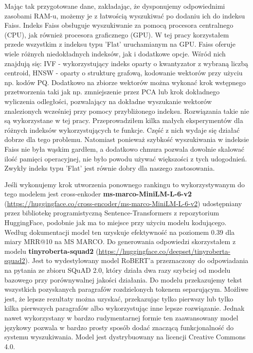 Mając tak przygotowane dane, zakładając, że dysponujemy odpowiednimi zasobami RAM-u, możemy je z łatwością wyszukiwać po dodaniu ich do indeksu Faiss. Indeks Faiss obsługuje wyszukiwanie za pomocą procesora centralnego (CPU), jak również procesora graficznego (GPU). W tej pracy korzystałem przede wszystkim z indeksu typu 'Flat' uruchamianym na GPU. Faiss oferuje wiele różnych niedokładnych indeksów, jak i dodatkowe opcje. Wśród nich znajdują się: IVF - wykorzystujący indeks oparty o kwantyzator z wybraną liczbą centroid, HNSW - oparty o strukturę grafową, kodowanie wektorów przy użyciu np. kodów PQ. Dodatkowo na zbiorze wektorów można wykonać krok wstępnego przetworzenia taki jak np. zmniejszenie przez PCA lub krok dokładnego wyliczenia odległości, pozwalający na dokładne wyszukanie wektorów znalezionych wcześniej przy pomocy przybliżonego indeksu. Rozwiązania takie nie są wykorzystane w tej pracy. Przeprowadziłem kilka małych eksperymentów dla różnych indeksów wykorzystujących te funkcje. Część z nich wydaje się działać dobrze dla tego problemu. Natomiast ponieważ szybkość wyszukiwania w indeksie Faiss nie była wąskim gardłem, a dodatkowo chmura pozwala dowolnie skalować ilość pamięci operacyjnej, nie było powodu używać większości z tych udogodnień. Zwykły indeks typu 'Flat' jest równie dobry dla naszego zastosowania.\newline

Jeśli wykonujemy krok utworzenia ponownego rankingu to wykorzystywanym do tego modelem jest cross-enkoder \textbf{
ms-marco-MiniLM-L-6-v2} (\url{https://huggingface.co/cross-encoder/ms-marco-MiniLM-L-6-v2}) udostępniany przez bibliotekę programistyczną Sentence-Transformers z repozytorium HuggingFace, podobnie jak ma to miejsce przy użyciu modelu kodującego. Według dokumentacji model ten uzyskuje efektywność na poziomem 0.39 dla miary MRR@10 na MS MARCO. Do generowania odpowiedzi skorzystałem z modelu \textbf{tinyroberta-squad2} (\url{https://huggingface.co/deepset/tinyroberta-squad2}). Jest to wydestylowany model RoBERT'a przeznaczony do odpowiadania na pytania ze zbioru SQuAD 2.0, który działa dwa razy szybciej od modelu bazowego przy porównywalnej jakości działania. Do modelu przekazujemy tekst wszystkich pozyskanych paragrafów rozdzielonych tokenem separującym. Możliwe jest, że lepsze rezultaty można uzyskać, przekazując tylko pierwszy lub tylko kilka pierwszych paragrafów albo wykorzystując inne lepsze rozwiązanie. Jednak nawet wykorzystany w bardzo rudymentarnej formie ten zaawansowany model językowy pozwala w bardzo prosty sposób dodać znaczącą funkcjonalność do systemu wyszukiwania. Model jest dystrybuowany na licencji Creative Commons 4.0.\newline

